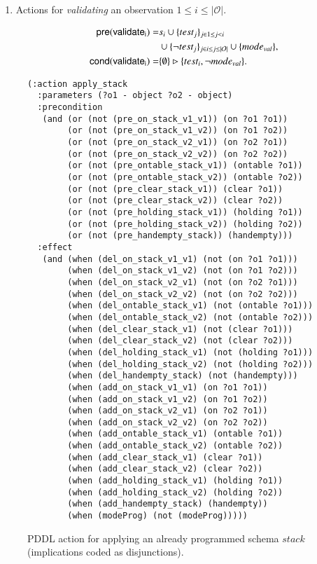 \documentclass[3p,times]{elsarticle}
\newcommand{\pre}{\mathsf{pre}}  %
\newcommand{\cond}{\mathsf{cond}}   %
\begin{document}
\begin{itemize}
\begin{enumerate}
\item Actions for {\em validating} an observation {\tt\small $1\leq i\leq |\mathcal{O}|$}.
\begin{small}
\begin{align*}
\hspace*{7pt}\pre(\mathsf{validate_{i}})=&s_i\cup\{test_j\}_{j\in 1\leq j<i}\\
&\cup\{\neg test_j\}_{j\in i\leq j\leq |\mathcal{O}|}\cup \{mode_{val}\},\\
\cond(\mathsf{validate_{i}})=&\{\emptyset\}\rhd\{test_i,\neg mode_{val}\}.
\end{align*}
\end{small}
\end{enumerate}
\end{itemize}

\begin{figure}
\begin{scriptsize}
\begin{verbatim}
(:action apply_stack
  :parameters (?o1 - object ?o2 - object)
  :precondition
   (and (or (not (pre_on_stack_v1_v1)) (on ?o1 ?o1))
        (or (not (pre_on_stack_v1_v2)) (on ?o1 ?o2))
        (or (not (pre_on_stack_v2_v1)) (on ?o2 ?o1))
        (or (not (pre_on_stack_v2_v2)) (on ?o2 ?o2))
        (or (not (pre_ontable_stack_v1)) (ontable ?o1))
        (or (not (pre_ontable_stack_v2)) (ontable ?o2))
        (or (not (pre_clear_stack_v1)) (clear ?o1))
        (or (not (pre_clear_stack_v2)) (clear ?o2))
        (or (not (pre_holding_stack_v1)) (holding ?o1))
        (or (not (pre_holding_stack_v2)) (holding ?o2))
        (or (not (pre_handempty_stack)) (handempty)))
  :effect
   (and (when (del_on_stack_v1_v1) (not (on ?o1 ?o1)))
        (when (del_on_stack_v1_v2) (not (on ?o1 ?o2)))
        (when (del_on_stack_v2_v1) (not (on ?o2 ?o1)))
        (when (del_on_stack_v2_v2) (not (on ?o2 ?o2)))
        (when (del_ontable_stack_v1) (not (ontable ?o1)))
        (when (del_ontable_stack_v2) (not (ontable ?o2)))
        (when (del_clear_stack_v1) (not (clear ?o1)))
        (when (del_clear_stack_v2) (not (clear ?o2)))
        (when (del_holding_stack_v1) (not (holding ?o1)))
        (when (del_holding_stack_v2) (not (holding ?o2)))
        (when (del_handempty_stack) (not (handempty)))
        (when (add_on_stack_v1_v1) (on ?o1 ?o1))
        (when (add_on_stack_v1_v2) (on ?o1 ?o2))
        (when (add_on_stack_v2_v1) (on ?o2 ?o1))
        (when (add_on_stack_v2_v2) (on ?o2 ?o2))
        (when (add_ontable_stack_v1) (ontable ?o1))
        (when (add_ontable_stack_v2) (ontable ?o2))
        (when (add_clear_stack_v1) (clear ?o1))
        (when (add_clear_stack_v2) (clear ?o2))
        (when (add_holding_stack_v1) (holding ?o1))
        (when (add_holding_stack_v2) (holding ?o2))
        (when (add_handempty_stack) (handempty))
        (when (modeProg) (not (modeProg)))))
\end{verbatim}
\end{scriptsize}
 \caption{\small PDDL action for applying an already programmed schema $stack$ (implications coded as disjunctions).}
\label{fig:compilation}
\end{figure}
\end{document}
